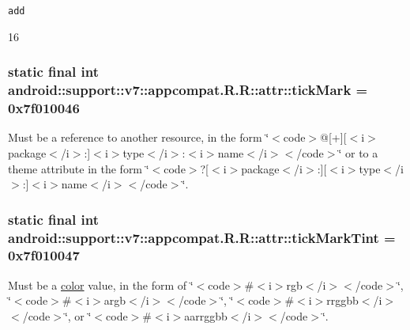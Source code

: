 {\tt add}

16\hypertarget{classandroid_1_1support_1_1v7_1_1appcompat_1_1_r_1_1attr_49afaba54ed0dd18144f501b63fd84a5}{
\subsubsection[{tickMark}]{\setlength{\rightskip}{0pt plus 5cm}static final int android::support::v7::appcompat.R.R::attr::tickMark = 0x7f010046}}
\label{classandroid_1_1support_1_1v7_1_1appcompat_1_1_r_1_1attr_49afaba54ed0dd18144f501b63fd84a5}


Must be a reference to another resource, in the form \char`\"{}$<$code$>$@\mbox{[}+\mbox{]}\mbox{[}$<$i$>$package$<$/i$>$:\mbox{]}$<$i$>$type$<$/i$>$:$<$i$>$name$<$/i$>$$<$/code$>$\char`\"{} or to a theme attribute in the form \char`\"{}$<$code$>$?\mbox{[}$<$i$>$package$<$/i$>$:\mbox{]}\mbox{[}$<$i$>$type$<$/i$>$:\mbox{]}$<$i$>$name$<$/i$>$$<$/code$>$\char`\"{}. \hypertarget{classandroid_1_1support_1_1v7_1_1appcompat_1_1_r_1_1attr_0184f20d22fbdfbc8e2acb934d0d2a5d}{
\subsubsection[{tickMarkTint}]{\setlength{\rightskip}{0pt plus 5cm}static final int android::support::v7::appcompat.R.R::attr::tickMarkTint = 0x7f010047}}
\label{classandroid_1_1support_1_1v7_1_1appcompat_1_1_r_1_1attr_0184f20d22fbdfbc8e2acb934d0d2a5d}


Must be a \hyperlink{classandroid_1_1support_1_1v7_1_1appcompat_1_1_r_1_1color}{color} value, in the form of \char`\"{}$<$code$>$\#$<$i$>$rgb$<$/i$>$$<$/code$>$\char`\"{}, \char`\"{}$<$code$>$\#$<$i$>$argb$<$/i$>$$<$/code$>$\char`\"{}, \char`\"{}$<$code$>$\#$<$i$>$rrggbb$<$/i$>$$<$/code$>$\char`\"{}, or \char`\"{}$<$code$>$\#$<$i$>$aarrggbb$<$/i$>$$<$/code$>$\char`\"{}. 

